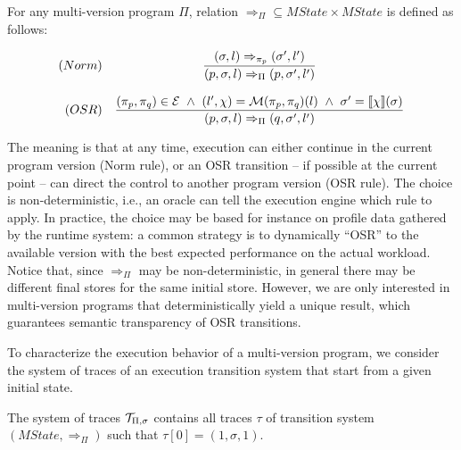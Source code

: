 \begin{definition}
\label{de:osr-semantics}
For any multi-version program $\Pi$, relation $\Rightarrow_{\Pi}\subseteq MState\times MState$ is defined as follows:%

\begin{footnotesize}
\begin{equation}
\label{eq:mv-big-step}
\begin{array}{rc}
(Norm)
&
\dfrac
{(\sigma, l)\Rightarrow_{\pi_p} (\sigma',l')}
{(p,\sigma, l)\Rightarrow_{\Pi} (p,\sigma',l')}
\\
\\
(OSR)
&
\dfrac
{(\pi_p,\pi_q)\in {\cal E} ~ \wedge ~ (l',\chi)={\cal M}(\pi_p,\pi_q)(l) ~ \wedge ~ \sigma'=[\![\chi]\!](\sigma)}
{(p,\sigma, l)\Rightarrow_{\Pi} (q,\sigma',l')}\\
\end{array}
\end{equation}
\end{footnotesize}
\end{definition}

\noindent The meaning is that at any time, execution can either continue in the current program version (Norm rule), or an OSR transition -- if possible at the current point -- can direct the control to another program version (OSR rule). The choice is non-deterministic, i.e., an oracle can tell the execution engine which rule to apply. In practice, the choice may be based for instance on profile data gathered by the runtime system: a common strategy is to dynamically ``OSR'' to the available version with the best expected performance on the actual workload. Notice that, since $\Rightarrow_{\Pi}$ may be non-deterministic, in general there may be different final stores for the same initial store. However, we are only interested in multi-version programs that deterministically yield a unique result, which guarantees semantic transparency of OSR transitions. 

\noindent To characterize the execution behavior of a multi-version program, we consider the system of traces of an execution transition system that start from a given initial state.

\begin{definition}
\label{de:mvp-exec-system}
The system of traces ${\cal T}_{\Pi,\sigma}$ contains all traces $\tau$ of transition system $(MState,\Rightarrow_{\Pi})$ such that $\tau[0]=(1,\sigma,1)$.
\end{definition}

